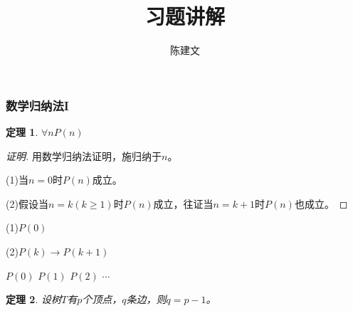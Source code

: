 \documentclass{beamer}
\begin{document}
\begin{CJK*}{UTF8}{gbsn}

  \newtheorem*{Thm}{定理}
  \newtheorem{Thm1}{定理}

\theoremstyle{definition}
\newtheorem{Def}{定义}
\theoremstyle{example}
\newtheorem*{Ex}{例：}
\newtheorem*{Exercise}{习题}
\newtheorem{Exercise1}{习题}

\date{}
\author{陈建文}
\title{习题讲解}
\begin{frame}
  \titlepage
\end{frame}


\begin{frame}
  \frametitle{数学归纳法I}

  \begin{Thm} 
  $\forall n P(n)$   
\end{Thm}\pause
\begin{proof}[证明]
  用数学归纳法证明，施归纳于$n$。\pause

  (1)当$n=0$时$P(n)$成立。\pause

  (2)假设当$n=k(k\geq 1)$时$P(n)$成立，往证当$n=k+1$时$P(n)$也成立。
\end{proof}
\pause
(1)$P(0)$\pause

(2)$P(k)\to P(k+1)$

\pause
$P(0)$ \pause $P(1)$ \pause  $P(2)$ \pause $\cdots$
  
\end{frame}

\begin{frame}
    \begin{Thm}
  设树$T$有$p$个顶点，$q$条边，则$q = p-1$。
  \end{Thm}\pause
\centering
  \begin{minipage}{0.24\linewidth}
    \centering
\end{minipage}
\end{frame}
\end{CJK*}
\end{document}

